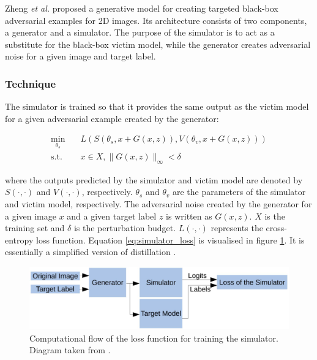 Zheng \textit{et al.} \cite{zheng_black_box_GAN} proposed a generative model for creating targeted black-box adversarial examples for 2D images. Its architecture consists of two components, a generator and a simulator. The purpose of the simulator is to act as a substitute for the black-box victim model, while the generator creates adversarial noise for a given image and target label.

\subsubsection{Technique}

The simulator is trained so that it provides the same output as the victim model for a given adversarial example created by the generator:

\begin{equation}
\begin{aligned}
\min_{\theta_s} \quad & L(S(\theta_s, x + G(x, z)),V(\theta_v, x + G(x, z)))\\
\textrm{s.t.} \quad & x \in X, \|G(x, z)\|_\infty < \delta
\label{eq:simulator_loss}
\end{aligned}
\end{equation}

\noindent where the outputs predicted by the simulator and victim model are denoted by $S(\cdot,\cdot)$ and $V(\cdot,\cdot)$, respectively. $\theta_s$ and $\theta_v$ are the parameters of the simulator and victim model, respectively. The adversarial noise created by the generator for a given image $x$ and a given target label $z$ is written as $G(x,z)$. $X$ is the training set and $\delta$ is the perturbation budget. $L(\cdot,\cdot)$ represents the cross-entropy loss function. Equation \ref{eq:simulator_loss} is visualised in figure \ref{fig:zheng_simulator_loss}. It is essentially a simplified version of distillation \cite{distillation}.

\begin{figure}[h]
    \centering
    \includegraphics[width=1\textwidth]{graphics/simulator_loss.JPG}
    \caption{Computational flow of the loss function for training the simulator. Diagram taken from \cite{zheng_black_box_GAN}.}
    \label{fig:zheng_simulator_loss}
\end{figure}

